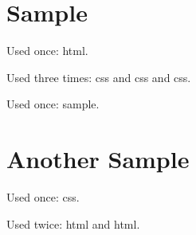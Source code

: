 \documentclass[12pt]{article}
\begin{document}
\section{Sample} 

Used once: \gls{html}. 

Used three times: \gls{css} and \gls{css} and \gls{css}. 

Used once: \gls{sample}. 

\section{Another Sample} 

Used once: \gls{css}. 

Used twice: \gls{html} and \gls{html}. 

\printglossaries 
\end{document}
